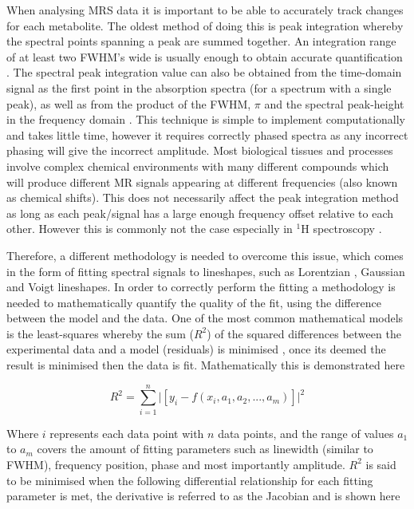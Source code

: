 When analysing \ac{MRS} data it is important to be able to accurately track changes for each metabolite. The oldest method of doing this is peak integration whereby the spectral points spanning a peak are summed together. An integration range of at least two \ac{FWHM}'s wide is usually enough to obtain accurate quantification \cite{Near2021PreprocessingRecommendations}. The spectral peak integration value can also be obtained from the time-domain signal as the first point in the absorption spectra (for a spectrum with a single peak), as well as from the product of the \ac{FWHM}, $\pi$ and the spectral peak-height in the frequency domain \cite{deGraaf2019InSpectroscopy}. This technique is simple to implement computationally and takes little time, however it requires correctly phased spectra as any incorrect phasing will give the incorrect amplitude. Most biological tissues and processes involve complex chemical environments with many different compounds which will produce different MR signals appearing at different frequencies (also known as chemical shifts). This does not necessarily affect the peak integration method as long as each peak/signal has a large enough frequency offset relative to each other. However this is commonly not the case especially in $^1$H spectroscopy \cite{Alger2010QuantitativeReview}. 

Therefore, a different methodology is needed to overcome this issue, which comes in the form of fitting spectral signals to lineshapes, such as Lorentzian \cite{Lorentz1895TheHeat}, Gaussian and Voigt \cite{Near2021PreprocessingRecommendations} lineshapes. In order to correctly perform the fitting a methodology is needed to mathematically quantify the quality of the fit, using the difference between the model and the data. One of the most common mathematical models is the least-squares \cite{Golub1973TheSeparate} whereby the sum ($R^2$) of the squared differences between the experimental data and a model (residuals) is minimised \cite{Vanhamme2001MRMethods}, once its deemed the result is minimised then the data is fit. Mathematically this is demonstrated here 

\begin{equation}
    R^2 = \sum_{i=1}^{n} \big| [y_i - f(x_i,a_1,a_2,...,a_m)] \big|^2
    \label{eqn:theory:LS}
\end{equation}

\noindent Where $i$ represents each data point with $n$ data points, and the range of values $a_1$ to $a_m$ covers the amount of fitting parameters such as linewidth (similar to \ac{FWHM}), frequency position, phase and most importantly amplitude. $R^2$ is said to be minimised when the following differential relationship for each fitting parameter is met, the derivative is referred to as the Jacobian and is shown here

